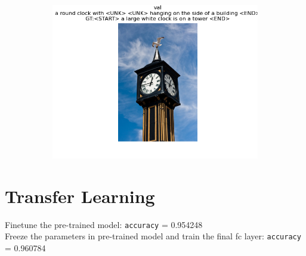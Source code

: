 \documentclass{article}
\begin{document}
\begin{figure}[htbp]
\begin{subfigure}{.5\textwidth}
    \end{subfigure}
    \begin{subfigure}{.5\textwidth}
      \centering
      \includegraphics[width=.88\linewidth]{Figure_4.png}
    \end{subfigure}
\end{figure}

\newpage

\section{Transfer Learning}

Finetune the pre-trained model: \texttt{accuracy} = 0.954248 \\
Freeze the parameters in pre-trained model and train the final fc layer: \texttt{accuracy} = 0.960784
 
\end{document}
